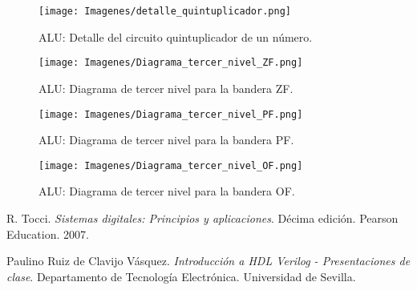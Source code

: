\documentclass[journal,trans]{IEEEtran}
\begin{document}
\begin{figure}[h!]
	\centering
	\texttt{[image: Imagenes/detalle\_quintuplicador.png]}
	\caption{ALU: Detalle del circuito quintuplicador de un número.}
	\label{fig:detalle_quintuplicador}
\end{figure}

\begin{figure}[h!]
	\centering
	\texttt{[image: Imagenes/Diagrama\_tercer\_nivel\_ZF.png]}
	\caption{ALU: Diagrama de tercer nivel para la bandera ZF.}
	\label{fig:Diagrama_tercer_nivel_ZF}
\end{figure}

\begin{figure}[h!]
	\centering
	\texttt{[image: Imagenes/Diagrama\_tercer\_nivel\_PF.png]}
	\caption{ALU: Diagrama de tercer nivel para la bandera PF.}
	\label{fig:Diagrama_tercer_nivel_PF}
\end{figure}

\begin{figure}[h!]
	\centering
	\texttt{[image: Imagenes/Diagrama\_tercer\_nivel\_OF.png]}
	\caption{ALU: Diagrama de tercer nivel para la bandera OF.}
	\label{fig:Diagrama_tercer_nivel_OF}
\end{figure}

\newpage

\begin{thebibliography}{1}

R. Tocci. \emph{Sistemas digitales: Principios y aplicaciones}. Décima edición. Pearson Education. 2007.

Paulino Ruiz de Clavijo Vásquez. \emph{Introducción a HDL Verilog - Presentaciones de clase}. Departamento de Tecnología Electrónica. Universidad de Sevilla.


\end{thebibliography}
\end{document}
